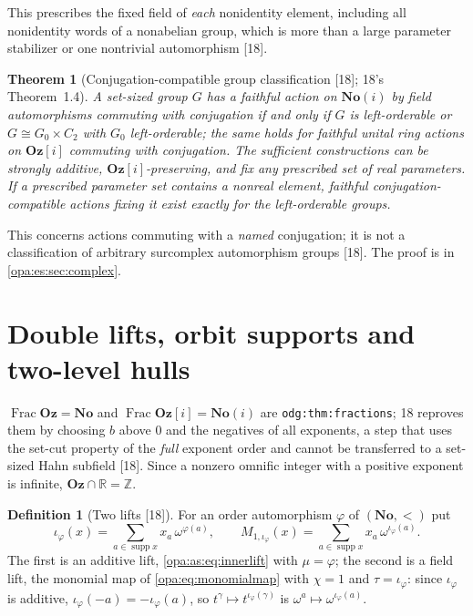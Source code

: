 \documentclass[11pt,oneside]{article}
\numberwithin{equation}{section}
\newtheorem{theorem}{Theorem}[section]
\theoremstyle{definition}
\newtheorem{definition}[definition]{Definition}
\theoremstyle{remark}
\newcommand{\No}{\mathbf{No}}
\newcommand{\Oz}{\mathbf{Oz}}
\newcommand{\Og}{\mathbf{Oz}[i]}
\newcommand{\SC}{\mathbf{No}(i)}
\newcommand{\R}{\mathbb R}
\newcommand{\Z}{\mathbb Z}
\newcommand{\supp}{\operatorname{supp}}
\newcommand{\Frac}{\operatorname{Frac}}
\newcommand{\src}[1]{\textup{\textsf{\small[#1]}}}
\newcommand{\lbl}[1]{\nolinkurl{#1}}
\begin{document}
This prescribes the fixed field of \emph{each} nonidentity element, including all nonidentity words of a nonabelian group, which is
more than a large parameter stabilizer or one nontrivial automorphism \src{18}.

\begin{theorem}[Conjugation-compatible group classification \src{18}; 18's Theorem~1.4]\label{opa:es:thm:complexmain}
A set-sized group $G$ has a faithful action on $\SC$ by field automorphisms commuting with conjugation if and only if $G$ is
left-orderable or $G\cong G_0\times C_2$ with $G_0$ left-orderable; the same holds for faithful unital ring actions on $\Og$ commuting
with conjugation. The sufficient constructions can be strongly additive, $\Og$-preserving, and fix any prescribed set of real
parameters. If a prescribed parameter set contains a nonreal element, faithful conjugation-compatible actions fixing it exist
exactly for the left-orderable groups.
\end{theorem}

This concerns actions commuting with a \emph{named} conjugation; it is not a classification of arbitrary surcomplex automorphism
groups \src{18}. The proof is in \cref{opa:es:sec:complex}.

\section{Double lifts, orbit supports and two-level hulls}\label{opa:es:sec:lift}

$\Frac\Oz=\No$ and $\Frac\Og=\SC$ are \lbl{odg:thm:fractions}; 18 reproves them by choosing $b$ above $0$ and the negatives of all
exponents, a step that uses the set-cut property of the \emph{full} exponent order and cannot be transferred to a set-sized Hahn
subfield \src{18}. Since a nonzero omnific integer with a positive exponent is infinite, $\Oz\cap\R=\Z$.

\begin{definition}[Two lifts \src{18}]\label{opa:es:def:lift}
For an order automorphism $\varphi$ of $(\No,<)$ put
\begin{equation}\label{opa:es:eq:lifts}
 \iota_\varphi(x)=\sum_{a\in\supp x}x_a\,\omega^{\varphi(a)},\qquad
 M_{1,\iota_\varphi}(x)=\sum_{a\in\supp x}x_a\,\omega^{\iota_\varphi(a)} .
\end{equation}
The first is an additive lift, \eqref{opa:as:eq:innerlift} with $\mu=\varphi$; the second is a field lift, the monomial map of
\eqref{opa:eq:monomialmap} with $\chi=1$ and $\tau=\iota_\varphi$: since $\iota_\varphi$ is additive, $\iota_\varphi(-a)=-\iota_\varphi(a)$, so
$t^\gamma\mapsto t^{\iota_\varphi(\gamma)}$ is $\omega^a\mapsto\omega^{\iota_\varphi(a)}$.
\end{definition}
\end{document}

